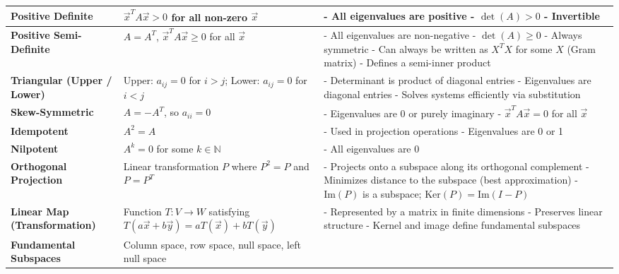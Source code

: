 \documentclass[12pt]{article}
\begin{document}
\begin{longtable}{|>{\bfseries}m{3.5cm}|m{5cm}|m{10.5cm}|}
		\hline
		Positive Definite & $\vec{x}^T A \vec{x} > 0$ for all non-zero $\vec{x}$ &
		- All eigenvalues are positive \newline
		- $\det(A) > 0$ \newline
		- Invertible \\
		\hline
		Positive Semi-Definite & $A = A^T$, $\vec{x}^T A \vec{x} \ge 0$ for all $\vec{x}$ &
		- All eigenvalues are non-negative \newline
		- $\det(A) \ge 0$ \newline
		- Always symmetric \newline
		- Can always be written as $X^T X$ for some $X$ (Gram matrix) \newline
		- Defines a semi-inner product \\
		\hline
		Triangular (Upper / Lower) &
		Upper: $a_{ij} = 0$ for $i > j$; Lower: $a_{ij} = 0$ for $i < j$ &
		- Determinant is product of diagonal entries \newline
		- Eigenvalues are diagonal entries \newline
		- Solves systems efficiently via substitution \\
		\hline
		Skew-Symmetric & $A = -A^T$, so $a_{ii} = 0$ &
		- Eigenvalues are 0 or purely imaginary \newline
		- $\vec{x}^T A \vec{x} = 0$ for all $\vec{x}$ \\
		\hline
		Idempotent & $A^2 = A$ &
		- Used in projection operations \newline
		- Eigenvalues are 0 or 1 \\
		\hline
		Nilpotent & $A^k = 0$ for some $k \in \mathbb{N}$ &
		- All eigenvalues are 0 \\
		\hline
		Orthogonal Projection & Linear transformation $P$ where $P^2 = P$
		and $P = P^T$ &
		- Projects onto a subspace along its orthogonal complement \newline
		- Minimizes distance to the subspace (best approximation) \newline
		- $\text{Im}(P)$ is a subspace; $\text{Ker}(P) = \text{Im}(I - P)$ \\
		\hline
		Linear Map (Transformation) & Function $T: V \rightarrow W$
		satisfying $T(a\vec{x} + b\vec{y}) = aT(\vec{x}) + bT(\vec{y})$ &
		- Represented by a matrix in finite dimensions \newline
		- Preserves linear structure \newline
		- Kernel and image define fundamental subspaces \\
		\hline
		Fundamental Subspaces & Column space, row space, null space, left null space &

\end{longtable}
\end{document}
